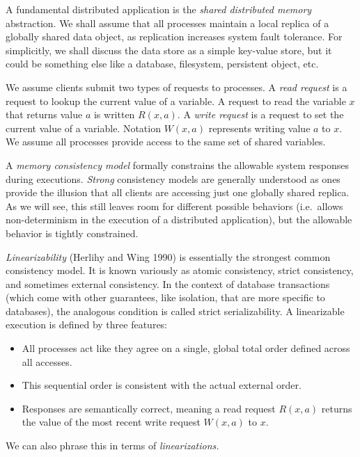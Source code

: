 \documentclass[]             %
{NASA}                       %
\theoremstyle{definition}
\providecommand{\tightlist}{%
  \setlength{\itemsep}{0pt}\setlength{\parskip}{0pt}}
\begin{document}
\label{sec:atomic}

A fundamental distributed application is the \emph{shared distributed
memory} abstraction. We shall assume that all processes maintain a local
replica of a globally shared data object, as replication increases
system fault tolerance. For simplicitly, we shall discuss the data store
as a simple key-value store, but it could be something else like a
database, filesystem, persistent object, etc.

We assume clients submit two types of requests to processes. A
\emph{read request} is a request to lookup the current value of a
variable. A request to read the variable \(x\) that returns value \(a\)
is written \(R(x,a)\). A \emph{write request} is a request to set the
current value of a variable. Notation \(W(x,a)\) represents writing
value \(a\) to \(x\). We assume all processes provide access to the same
set of shared variables.

A \emph{memory consistency model} formally constrains the allowable
system responses during executions. \emph{Strong} consistency models are
generally understood as ones provide the illusion that all clients are
accessing just one globally shared replica. As we will see, this still
leaves room for different possible behaviors (i.e.~allows
non-determinism in the execution of a distributed application), but the
allowable behavior is tightly constrained.

\emph{Linearizability} (Herlihy and Wing 1990) is essentially the
strongest common consistency model. It is known variously as atomic
consistency, strict consistency, and sometimes external consistency. In
the context of database transactions (which come with other guarantees,
like isolation, that are more specific to databases), the analogous
condition is called strict serializability. A linearizable execution is
defined by three features:

\begin{itemize}
\tightlist
\item
  All processes act like they agree on a single, global total order
  defined across all accesses.
\item
  This sequential order is consistent with the actual external order.
\item
  Responses are semantically correct, meaning a read request \(R(x, a)\)
  returns the value of the most recent write request \(W(x, a)\) to
  \(x\).
\end{itemize}

We can also phrase this in terms of \emph{linearizations.}
\end{document}
